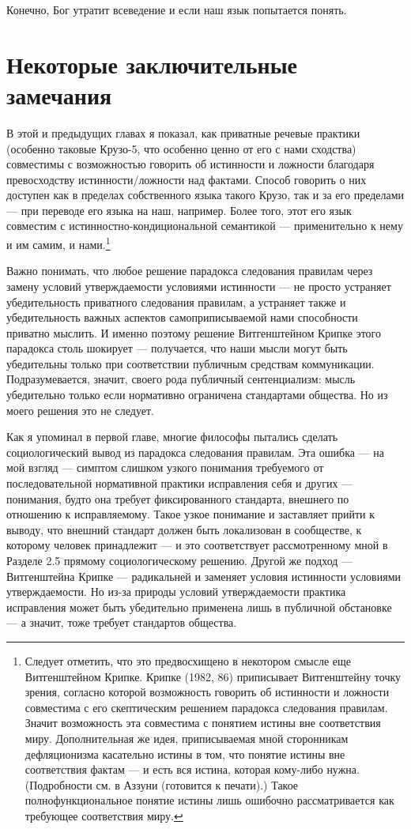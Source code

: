 \documentclass[11pt]{book}
\begin{document}
Конечно, Бог утратит всеведение и если наш язык попытается понять.

\section{Некоторые заключительные замечания}

В этой и предыдущих главах я показал, как приватные речевые практики (особенно таковые Крузо-5, что особенно ценно от его с нами сходства) совместимы с возможностью говорить об истинности и ложности благодаря превосходству истинности/ложности над фактами. Способ говорить о них доступен как в пределах собственного языка такого Крузо, так и за его пределами --- при переводе его языка на наш, например. Более того, этот его язык совместим с истинностно-кондициональной семантикой --- применительно к нему и им самим, и нами.\footnote{Следует отметить, что это предвосхищено в некотором смысле еще Витгенштейном Крипке. Крипке (1982, 86) приписывает Витгенштейну точку зрения, согласно которой возможность говорить об истинности и ложности совместима с его скептическим решением парадокса следования правилам. Значит возможность эта совместима с понятием истины вне соответствия миру. Дополнительная же идея, приписываемая мной сторонникам дефляционизма касательно истины в том, что понятие истины вне соответствия фактам --- и есть вся истина, которая кому-либо нужна. (Подробности см. в Аззуни (готовится к печати).) Такое полнофункциональное понятие истины лишь ошибочно рассматривается как требующее соответствия миру.}

Важно понимать, что любое решение парадокса следования правилам через замену условий утверждаемости условиями истинности --- не просто устраняет убедительность приватного следования правилам, а устраняет также и убедительность важных аспектов самоприписываемой нами способности приватно мыслить. И именно поэтому решение Витгенштейном Крипке этого парадокса столь шокирует --- получается, что наши мысли могут быть убедительны только при соответствии публичным средствам коммуникации. Подразумевается, значит, своего рода публичный сентенциализм: мысль убедительно только если нормативно ограничена стандартами общества. Но из моего решения это не следует.

Как я упоминал в первой главе, многие философы пытались сделать социологический вывод из парадокса следования правилам. Эта ошибка --- на мой взгляд --- симптом слишком узкого понимания требуемого от последовательной нормативной практики исправления себя и других --- понимания, будто она требует фиксированного стандарта, внешнего по отношению к исправляемому. Такое узкое понимание и заставляет прийти к выводу, что внешний стандарт должен быть локализован в сообществе, к которому человек принадлежит --- и это соответствует рассмотренному мной в Разделе 2.5 прямому социологическому решению. Другой же подход --- Витгенштейна Крипке --- радикальней и заменяет условия истинности условиями утверждаемости. Но из-за природы условий утверждаемости практика исправления может быть убедительно применена лишь в публичной обстановке --- а значит, тоже требует стандартов общества.
\end{document}
